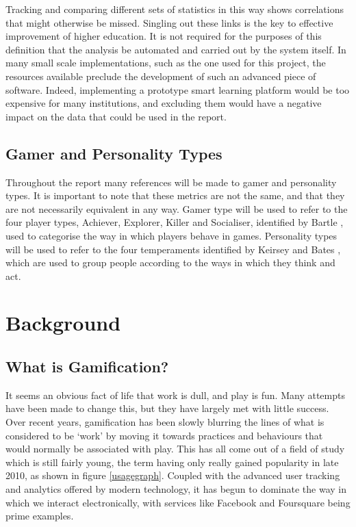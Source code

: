 \documentclass[12pt,a4paper,twoside]{report}
\begin{document}
Tracking and comparing different sets of statistics in this way shows correlations that might otherwise be missed. Singling out these links is the key to effective improvement of higher education. It is not required for the purposes of this definition that the analysis be automated and carried out by the system itself. In many small scale implementations, such as the one used for this project, the resources available preclude the development of such an advanced piece of software. Indeed, implementing a prototype smart learning platform would be too expensive for many institutions, and excluding them would have a negative impact on the data that could be used in the report.

\section{Gamer and Personality Types}
Throughout the report many references will be made to gamer and personality types. It is important to note that these metrics are not the same, and that they are not necessarily equivalent in any way. Gamer type will be used to refer to the four player types, Achiever, Explorer, Killer and Socialiser, identified by Bartle \cite{bartle1996hearts}, used to categorise the way in which players behave in games. Personality types will be used to refer to the four temperaments identified by Keirsey and Bates \cite{keirsey1998please}, \cite{keirsey1984} which are used to group people according to the ways in which they think and act.

\chapter{Background}
\section{What is Gamification?}
It seems an obvious fact of life that work is dull, and play is fun. Many attempts have been made to change this, but they have largely met with little success. Over recent years, gamification has been slowly blurring the lines of what is considered to be `work' by moving it towards practices and behaviours that would normally be associated with play. This has all come out of a field of study which is still fairly young, the term having only really gained popularity in late 2010, as shown in figure \ref{usagegraph}. Coupled with the advanced user tracking and analytics offered by modern technology, it has begun to dominate the way in which we interact electronically, with services like Facebook and Foursquare being prime examples.
\end{document}
